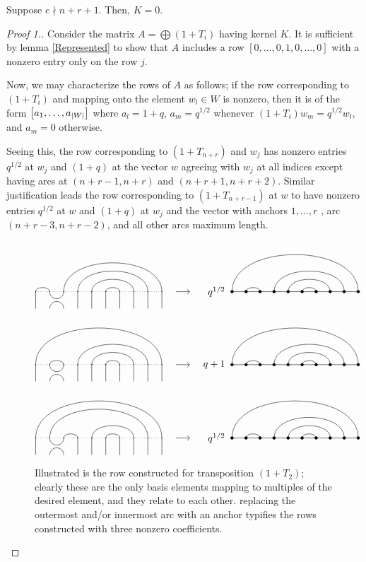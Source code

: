 \documentclass{amsart}
\begin{document}
\begin{lemma}\label{Trivial}
  Suppose $e \nmid n + r + 1$.
  Then, $K = 0$.
\end{lemma}
\begin{proof}[Proof 1.]
  Consider the matrix $A = \bigoplus (1 + T_i)$ having kernel $K$.
  It is sufficient by lemma \ref{Represented} to show that $A$ includes a row $[0,\dots,0,1,0,\dots,0]$ with a nonzero entry only on the row $j$.

  Now, we may characterize the rows of $A$ as follows;
  if the row corresponding to $(1 + T_i)$ and mapping onto the element $w_l \in W$ is nonzero, then it is of the form $\left[ a_1,\dots,a_{\left| W \right|} \right]$ where $a_l = 1 + q$, $a_m = q^{1/2}$ whenever $(1 + T_i)w_m = q^{1/2}w_l$, and $a_m = 0$ otherwise.
  
  Seeing this, the row corresponding to $(1 + T_{n + r})$ and $w_j$ has nonzero entries $q^{1/2}$ at $w_j$ and $(1 + q)$ at the vector $w$ agreeing with $w_j$ at all indices except having arcs at $(n+r-1,n+r)$ and $(n+r+1,n+r+2)$.
  Similar justification leads the row corresponding to $(1 + T_{n+r-1})$ at $w$ to have nonzero entries $q^{1/2}$ at $w$ and $(1 + q)$ at $w_j$ and the vector with anchors $1,\dots,r$ , arc $(n+r-3,n+r-2)$, and all other arcs maximum length.
  
  \begin{figure}
   \[
     \Action{10}{1/2,3/10,4/9,5/8,6/7}{2}{1/10,2/3,4/9,5/8,6/7}{q^{1/2}}
   \]
   \[
     \Action{10}{1/10,2/3,4/9,5/8,6/7}{2}{1/10,2/3,4/9,5/8,6/7}{q+1}
   \]
   \[
     \Action{10}{1/10,2/9,3/4,5/8,6/7}{2}{1/10,2/3,4/9,5/8,6/7}{q^{1/2}}
   \]
   \caption{Illustrated is the row constructed for transposition $(1 + T_2)$; clearly these are the only basis elements mapping to multiples of the desired element, and they relate to each other.
     replacing the outermost and/or innermost arc with an anchor typifies the rows constructed with three nonzero coefficients.}
 \label{Submatrix}
\end{figure}
 

\end{proof}
\end{document}

